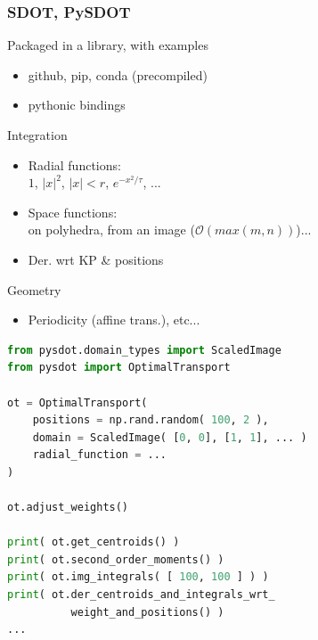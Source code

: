 \documentclass[aspectratio=169]{beamer}
\begin{document}
\begin{frame}[fragile]
    \frametitle{SDOT, PySDOT}

    \begin{minipage}[c][0.8\textheight][c]{0.44\textwidth}
        Packaged in a library, with examples
        \begin{itemize}
            \item github, pip, conda (precompiled)
            \item pythonic bindings
        \end{itemize}
    
        \vfill        
        Integration
        \begin{itemize}
            \item Radial functions: \\ $1$, $|x|^2$, $|x| < r$, $e^{-x^2 / \tau}$, ...
            \item Space functions: \\ on polyhedra, from an image ($\mathcal{O}( max( m, n ) )$)...
            \item Der. wrt KP \& positions
        \end{itemize}
    
        \vfill
        Geometry
        \begin{itemize}
            \item Periodicity (affine trans.), etc...
        \end{itemize}
    \end{minipage}
    \begin{minipage}[c][0.8\textheight][c]{0.55\textwidth}
        \begin{scriptsize}
            \begin{lstlisting}[language=Python]
from pysdot.domain_types import ScaledImage
from pysdot import OptimalTransport

ot = OptimalTransport(
    positions = np.rand.random( 100, 2 ),
    domain = ScaledImage( [0, 0], [1, 1], ... )
    radial_function = ...
)

ot.adjust_weights()

print( ot.get_centroids() )
print( ot.second_order_moments() )
print( ot.img_integrals( [ 100, 100 ] ) )
print( ot.der_centroids_and_integrals_wrt_
          weight_and_positions() )
...
            \end{lstlisting}
        \end{scriptsize}
    \end{minipage}
\end{frame}
\end{document}
